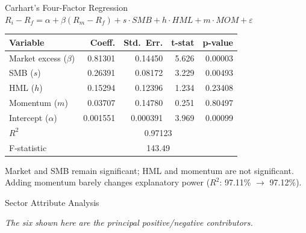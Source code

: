 \documentclass[11pt, aspectratio=43]{beamer}
\begin{document}
\begin{frame}{Carhart's Four-Factor Regression}
\centering
\small
$R_i - R_f = \alpha + \beta(R_m - R_f) + s \cdot SMB + h \cdot HML + m \cdot MOM + \varepsilon$

\vspace{0.5em}

\begin{tabular}{l r r r r}
\toprule
\textbf{Variable} & \textbf{Coeff.} & \textbf{Std.\ Err.} & \textbf{t-stat} & \textbf{p-value} \\
\midrule
Market excess ($\beta$) & 0.81301 & 0.14450 & 5.626 & 0.00003 \\
SMB ($s$) & 0.26391 & 0.08172 & 3.229 & 0.00493 \\
HML ($h$) & 0.15294 & 0.12396 & 1.234 & 0.23408 \\
Momentum ($m$) & 0.03707 & 0.14780 & 0.251 & 0.80497 \\
Intercept ($\alpha$) & 0.001551 & 0.000391 & 3.969 & 0.00099 \\
\midrule
$R^2$ & \multicolumn{4}{c}{0.97123} \\
F-statistic & \multicolumn{4}{c}{143.49} \\
\bottomrule
\end{tabular}

\vspace{0.5em}
\footnotesize
Market and SMB remain significant; HML and momentum are not significant. Adding momentum barely changes explanatory power ($R^2$: 97.11\% $\to$ 97.12\%).
\end{frame}

\begin{frame}{Sector Attribute Analysis}
\centering
\tiny
{}

\vspace{0.5em}
\footnotesize
\textit{The six shown here are the principal positive/negative contributors.}
\end{frame}
\end{document}

